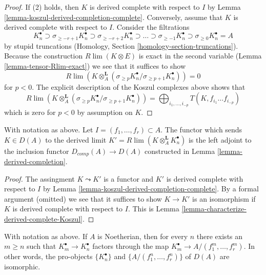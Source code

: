 \begin{proof}
If (2) holds, then $K$ is derived complete with respect to $I$
by Lemma \ref{lemma-koszul-derived-completion-complete}.
Conversely, assume that $K$ is derived complete with respect to $I$.
Consider the filtrations
$$
K_n^\bullet \supset
\sigma_{\geq -r + 1}K_n^\bullet \supset
\sigma_{\geq -r + 2}K_n^\bullet \supset \ldots \supset
\sigma_{\geq -1}K_n^\bullet \supset
\sigma_{\geq 0}K_n^\bullet = A
$$
by stupid truncations (Homology, Section \ref{homology-section-truncations}).
Because the construction $R\lim(K \otimes E)$ is exact in
the second variable (Lemma \ref{lemma-tensor-Rlim-exact})
we see that it suffices to show
$$
R\lim \left(
K \otimes_A^\mathbf{L}
(\sigma_{\geq p}K_n^\bullet/ \sigma_{\geq p + 1}K_n^\bullet)
\right) = 0
$$
for $p < 0$. The explicit description of the Koszul complexes above
shows that
$$
R\lim \left(
K \otimes_A^\mathbf{L}
(\sigma_{\geq p}K_n^\bullet/ \sigma_{\geq p + 1}K_n^\bullet)
\right) =
\bigoplus\nolimits_{i_1, \ldots, i_{-p}}
T(K, f_{i_1}\ldots f_{i_{-p}})
$$
which is zero for $p < 0$ by assumption on $K$.
\end{proof}

\begin{lemma}
\label{lemma-derived-completion-koszul}
With notation as above. Let $I = (f_1, \ldots, f_r) \subset A$.
The functor which sends $K \in D(A)$ to the derived limit
$K' = R\lim( K \otimes_A^\mathbf{L} K_n^\bullet )$ is the left
adjoint to the inclusion functor $D_{comp}(A) \to D(A)$
constructed in Lemma \ref{lemma-derived-completion}.
\end{lemma}

\begin{proof}
The assingment $K \leadsto K'$ is a functor and $K'$ is derived
complete with respect to $I$ by
Lemma \ref{lemma-koszul-derived-completion-complete}.
By a formal argument (omitted) we see that it suffices
to show $K \to K'$ is an isomorphism if $K$ is derived complete
with respect to $I$. This is
Lemma \ref{lemma-characterize-derived-complete-Koszul}.
\end{proof}

\begin{lemma}
\label{lemma-sequence-Koszul-complexes}
With notation as above. If $A$ is Noetherian, then for every $n$
there exists an $m \geq n$ such that $K_m^\bullet \to K_n^\bullet$
factors through the map $K_m^\bullet \to A/(f_1^m, \ldots, f_r^m)$.
In other words, the pro-objects $\{K_n^\bullet\}$ and
$\{A/(f_1^n, \ldots, f_r^n)\}$ of $D(A)$ are isomorphic.
\end{lemma}

